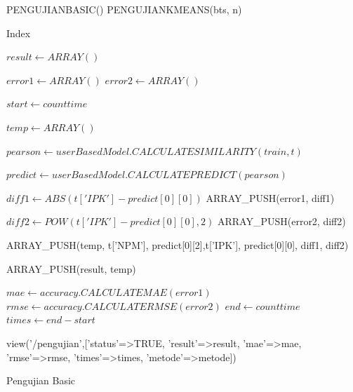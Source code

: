 \begin{algorithm}[H]
  \begin{algorithmic}[1]
            \State \Return PENGUJIANBASIC()
       \Else
            \State \Return PENGUJIANKMEANS(bts, n)
       \EndIf
    \EndProcedure
  \end{algorithmic} 
  \caption{Index}
  \label{alg:index}
\end{algorithm}

\begin{algorithm}[H]
  \begin{algorithmic}[1]
       \State $result \gets ARRAY()$
       
       \State $error1 \gets ARRAY()$
       \State $error2 \gets ARRAY()$
       
            \State $start \gets count time$
            
                \State $temp \gets ARRAY()$
                
                \State $pearson \gets userBasedModel.CALCULATESIMILARITY(train, t)$
                
                \State $predict \gets userBasedModel.CALCULATEPREDICT(pearson)$
                
                    \State $diff1 \gets ABS(t['IPK'] - predict[0][0])$
                    \State ARRAY\_PUSH(error1, diff1)
                    
                    \State $diff2 \gets POW(t['IPK'] - predict[0][0],2)$
                    \State ARRAY\_PUSH(error2, diff2)
                    
                    \State ARRAY\_PUSH(temp, t['NPM'], predict[0][2],t['IPK'], predict[0][0], diff1, diff2)
                    
                    \State ARRAY\_PUSH(result, temp)
                \EndIf
            \EndIf
       \EndFor
       
       \State $mae \gets accuracy.CALCULATEMAE(error1)$
       \State $rmse \gets accuracy.CALCULATERMSE(error2)$
       \State $end \gets count time$
       \State $times \gets end - start$
       
       \State \Return view('/pengujian',['status'=>TRUE, 'result'=>result, 'mae'=>mae, 'rmse'=>rmse, 'times'=>times, 'metode'=>metode])
    \EndProcedure
  \end{algorithmic} 
  \caption{Pengujian Basic}
  \label{alg:pengujianBasic}
\end{algorithm}

